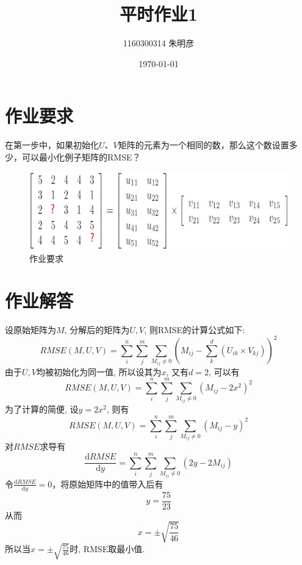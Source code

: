 \documentclass[12pt]{article}
\theoremstyle{definition}
\begin{document}
\title{平时作业1}
\author{1160300314 朱明彦}
\date{\today} %
\maketitle

\section{作业要求}
在第一步中，如果初始化$U$、$V$矩阵的元素为一个相同的数，那么这个数设置多少，可以最小化例子矩阵的RMSE？

\begin{figure}[H]
  \centering
  \includegraphics[width=0.8\linewidth]{fig/demand.png}
  \caption{作业要求}
  \label{fig:demand}
\end{figure}

\section{作业解答}
设原始矩阵为$M$, 分解后的矩阵为$U, V$, 则RMSE的计算公式如下:
$$
RMSE(M, U, V) = \sum_{i}^{n}\sum_{j}^{m}\sum_{M_{ij} \neq 0}\left(M_{ij} - \sum_{k}^{d}\left(U_{ik} \times V_{kj}\right)\right)^{2}
$$
由于$U, V$均被初始化为同一值, 所以设其为$x$, 又有$d = 2$, 可以有
$$
RMSE(M, U, V) = \sum_{i}^{n}\sum_{j}^{m}\sum_{M_{ij} \neq 0}\left(M_{ij} - 2x^2\right)^{2}
$$
为了计算的简便, 设$y = 2x^2$, 则有
$$
RMSE(M, U, V) = \sum_{i}^{n}\sum_{j}^{m}\sum_{M_{ij} \neq 0}\left(M_{ij} - y\right)^{2}
$$
对$RMSE$求导有
$$
\dfrac{\mathrm{d} RMSE }{\mathrm{d} y} = \sum_{i}^{n}\sum_{j}^{m}\sum_{M_{ij} \neq 0}\left(2y - 2M_{ij}\right)
$$
令$\frac{\mathrm{d} RMSE }{\mathrm{d} y} = 0$，将原始矩阵中的值带入后有
$$
y = \frac{75}{23}
$$
从而
$$
x = \pm \sqrt{\frac{75}{46}}
$$
所以当$x = \pm \sqrt{\frac{75}{46}}$时, RMSE取最小值.
\end{document}
